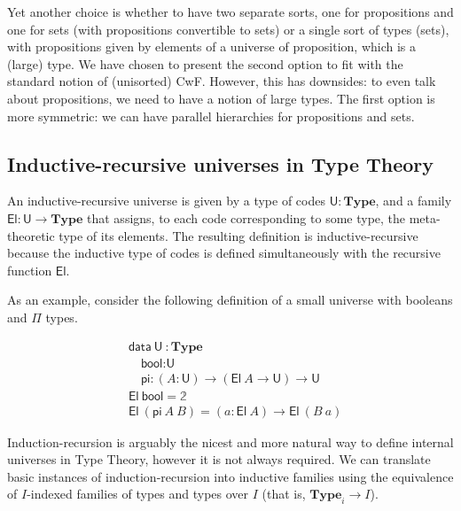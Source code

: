 \documentclass{easychair}
\newcommand{\mType}{\mathbf{Type}}
\newcommand{\U}{\textsf{U}}
\newcommand{\El}{\textsf{El}}
\providecommand\mathbbm{\mathbb}
\begin{document}

Yet another choice is whether to have two separate sorts, one for propositions
and one for sets (with propositions convertible to sets) or a single sort of
types (sets), with propositions given by elements of a universe of proposition,
which is a (large) type. We have chosen to present the second option to fit with
the standard notion of (unisorted) CwF. However, this has downsides: to even
talk about propositions, we need to have a notion of large types. The first
option is more symmetric: we can have parallel hierarchies for propositions and
sets.

\subsection{Inductive-recursive universes in Type Theory}\label{ir-universes}

An inductive-recursive universe is given by a type of codes $\U : \mType$, and a
family $\El : \U \to \mType$ that assigns, to each code corresponding to some
type, the meta-theoretic type of its elements. The resulting definition is
inductive-recursive because the inductive type of codes is defined
simultaneously with the recursive function $\El$.

As an example, consider the following definition of a small universe with
booleans and $\Pi$ types.

\begin{align*}
  & \textsf{data}\ \U\ : \mType \\
  & \quad \textsf{bool} : \U \\
  & \quad \textsf{pi} : (A : \U) \to (\El\ A \to \U) \to \U \\
  & \El\ \textsf{bool} = \mathbbm{2} \\
  & \El\ (\textsf{pi}\ A\ B) = (a : \El\ A) \to \El\ (B\ a)
\end{align*}


Induction-recursion is arguably the nicest and more natural way to define
internal universes in Type Theory, however it is not always required.
%
We can translate basic instances of induction-recursion into inductive families
using the equivalence of $I$-indexed families of types and types over $I$
(that is, $\mType_i \to I$).
\end{document}
